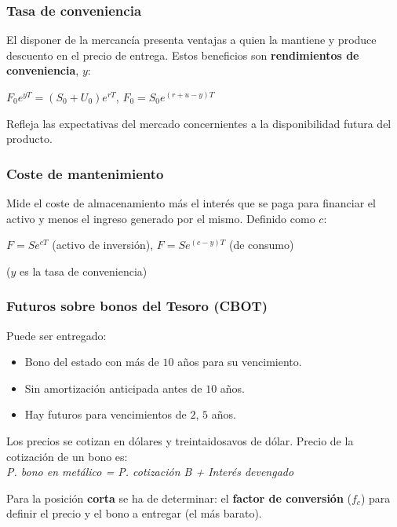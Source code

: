 \documentclass[
10pt, %
a4paper, %
oneside, %
headinclude,footinclude, %
BCOR5mm, %
]{scrartcl}
\newcommand{\n}[1]{\textbf{#1}}
\newcommand{\cur}[1]{\textit{#1}}
\newcommand{\sub}[1]{_{#1}}
\newcommand{\pot}[1]{^{#1}}
\newcommand{\f}[1]{{\large{${#1}$}}}
\newcounter{ex}
\begin{document}
		\subsubsection{Tasa de conveniencia}

			El disponer de la mercancía presenta ventajas a quien la mantiene y produce descuento en el precio de entrega. Estos beneficios son \n{rendimientos de conveniencia}, \f{y}:
			\begin{center} \f{F\sub{0}e\pot{yT} = (S\sub{0}+U\sub{0})e\pot{rT}}, \hspace{0.3cm} \f{F\sub{0} = S\sub{0}e\pot{(r+u-y)T}} \end{center}
			Refleja las expectativas del mercado concernientes a la disponibilidad futura del producto.

		\subsubsection{Coste de mantenimiento}

			Mide el coste de almacenamiento más el interés que se paga para financiar el activo y menos el ingreso generado por el mismo. Definido como \f{c}:
			\begin{center} \f{F = Se\pot{cT}} (activo de inversión), \hspace{0.3cm} \f{F = Se\pot{(c-y)T}} (de consumo) \end{center}
			(\f{y} es la tasa de conveniencia)

		\subsubsection{Futuros sobre bonos del Tesoro (CBOT)}

			Puede ser entregado:
			\begin{itemize}
				\item Bono del estado con más de \f{10} años para su vencimiento.
				\item Sin amortización anticipada antes de \f{10} años.
				\item Hay futuros para vencimientos de \f{2}, \f{5} años.
			\end{itemize}

			Los precios se cotizan en dólares y treintaidosavos de dólar. Precio de la cotización de un bono es:\\
			\cur{P. bono en metálico = P. cotización B + Interés devengado}

			Para la posición \n{corta} se ha de determinar: el \n{factor de conversión} (\f{f\sub{c}}) para definir el precio y el bono a entregar (el más barato).
\end{document}
